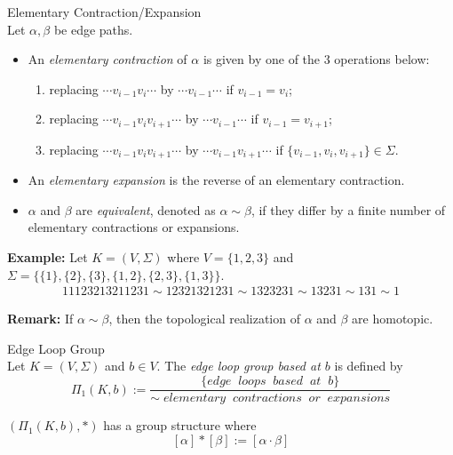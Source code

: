 \begin{definition}{Elementary Contraction/Expansion}\\
Let $\alpha,\beta$ be edge paths.
\begin{itemize}
    \item An \textit{elementary contraction} of $\alpha$ is given by one of the 3 operations below:
    \begin{enumerate}
        \item replacing $\cdots v_{i-1}v_i \cdots$ by $\cdots v_{i-1} \cdots$ if $v_{i-1} = v_i$;
        \item replacing $\cdots v_{i-1}v_iv_{i+1} \cdots$ by $\cdots v_{i-1}  \cdots$ if $v_{i-1} = v_{i+1}$;
        \item replacing $\cdots v_{i-1}v_iv_{i+1} \cdots$ by $\cdots v_{i-1} v_{i+1} \cdots$ if $\{ v_{i-1},v_{i}, v_{i+1} \} \in \Sigma$.
    \end{enumerate}
    \item An \textit{elementary expansion} is the reverse of an elementary contraction.
    \item $\alpha$ and $\beta$ are \textit{equivalent}, denoted as $\alpha \sim \beta$, if they differ by a finite number of elementary contractions or expansions.
\end{itemize}
\end{definition}

\noindent\textbf{Example:} Let $K = (V,\Sigma)$ where $V = \{ 1,2,3\}$ and $\Sigma= \{ \{1\} ,\{2\} ,\{3\}, \{1,2\}, \{2,3\} ,\{1,3\} \}$.
\begin{align*}
    11123213211231 \sim 12321321231 \sim 1323231 \sim 13231 \sim 131 \sim 1
\end{align*}

\noindent\textbf{Remark:} If $\alpha \sim \beta$, then the topological realization of $\alpha$ and $\beta$ are homotopic.

\begin{definition}{Edge Loop Group}\\
Let $K= (V, \Sigma)$ and $b \in V$. The \textit{edge loop group based at $b$} is defined by
$$\Pi_1(K,b) := \frac{\{edge\;\;loops\;\;based\;\;at\;\;b \}}{\sim\; elementary\;\;contractions\;\;or\;\; expansions}$$
\end{definition}

\begin{proposition}
    $(\Pi_1 (K,b) , *)$ has a group structure where
    $$[\alpha] * [\beta] := [\alpha \cdot \beta]$$
\end{proposition}

